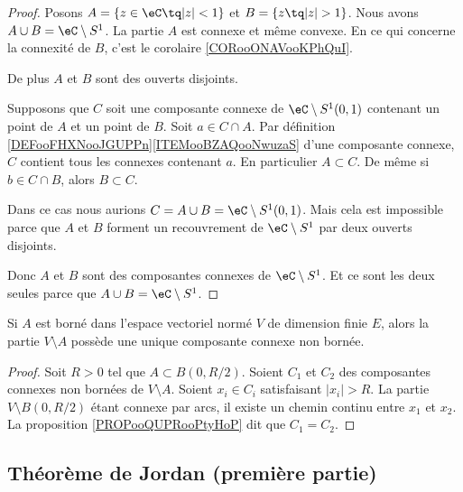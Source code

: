 \begin{proof}
	Posons \( A=\{ z\in \eC\tq | z |<1 \}\) et \( B=\{ z\tq| z |>1 \}\). Nous avons \( A\cup B=\eC\setminus S^1\). La partie \( A\) est connexe et même convexe. En ce qui concerne la connexité de \( B\), c'est le corolaire \ref{CORooONAVooKPhQuI}.

	De plus \( A\) et \( B\) sont des ouverts disjoints.

	Supposons que \( C\) soit une composante connexe de \( \eC\setminus S^1(0,1)\) contenant un point de \( A\) et un point de \( B\). Soit \( a\in C\cap A\). Par définition \ref{DEFooFHXNooJGUPPn}\ref{ITEMooBZAQooNwuzaS} d'une composante connexe, \( C\) contient tous les connexes contenant \( a\). En particulier \( A\subset C\). De même si \( b\in C\cap B\), alors \( B\subset C\).

	Dans ce cas nous aurions \( C=A\cup B=\eC\setminus S^1(0,1)\). Mais cela est impossible parce que \( A\) et \( B\) forment un recouvrement de \( \eC\setminus S^1\) par deux ouverts disjoints.

	Donc \( A\) et \( B\) sont des composantes connexes de \( \eC\setminus S^1\). Et ce sont les deux seules parce que \( A\cup B=\eC\setminus S^1\).
\end{proof}


\begin{proposition}	\label{PROPooIOROooDwIFFU}
	Si \( A\) est borné dans l'espace vectoriel normé \( V\) de dimension finie \( E\), alors la partie \( V\setminus A\) possède une unique composante connexe non bornée.
\end{proposition}

\begin{proof}
	Soit \( R>0\) tel que \( A\subset B(0,R/2)\). Soient \( C_1\) et \( C_2\) des composantes connexes non bornées de \( V\setminus A\). Soient \( x_i\in C_i\) satisfaisant \( | x_i |>R\). La partie \( V\setminus B(0,R/2)\) étant connexe par arcs, il existe un chemin continu entre \( x_1\) et \( x_2\). La proposition \ref{PROPooQUPRooPtyHoP} dit que \( C_1=C_2\).
\end{proof}


\subsection{Théorème de Jordan (première partie)}

